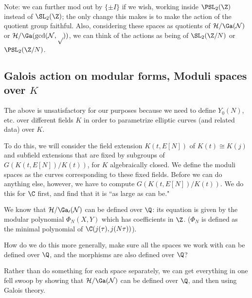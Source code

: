 Note: we can further mod out by $\{\pm I\}$ if we wish, working inside $\PSL_2(\Z)$ instead of $\SL_2(\Z)$; the only change this makes is to make the action of the quotient group faithful. Also, considering these spaces as quotients of $\cal H/\Ga(N)$ or $\cal H/\Ga(\gcd(N,p))$, we can think of the actions as being of $\SL_2(\Z/N)$ or $\PSL_2(\Z/N)$.

\subsection{Galois action on modular forms, Moduli spaces over $K$}
The above is unsatisfactory for our purposes because we need to define $Y_0(N)$, etc. over different fields $K$ in order to parametrize elliptic curves (and related data) over $K$.

To do this, we will consider the field extension $K(t,E[N])$ of $K(t)\cong K(j)$ and subfield extensions that are fixed by subgroups of $G(K(t,E[N])/K(t))$, for $K$ algebraically closed. We define the moduli spaces as the curves corresponding to these fixed fields. Before we can do anything else, however, we have to compute $G(K(t,E[N])/K(t))$. We do this for $\C$ first, and find that it is ``as large as can be."

We know that $\cal H/\Ga_0(N)$ can be defined over $\Q$: its equation is given by the modular polynomial $\Phi_N(X,Y)$ which has coefficients in $\Z$. ($\Phi_N$ is defined as the minimal polynomial of $\C(j(\tau), j(N\tau))$).

How do we do this more generally, make sure all the spaces we work with can be defined over $\Q$, and the morphisms are also defined over $\Q$?

Rather than do something for each space separately, we can get everything in one fell swoop by showing that $\cal H/\Ga(N)$ can be defined over $\Q$, and then using Galois theory.

